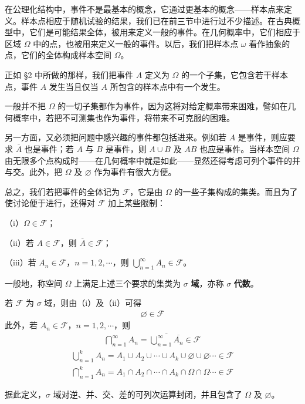 \documentclass[../../main.tex]{subfiles}
\begin{document}
在公理化结构中，事件不是最基本的概念，它通过更基本的概念——样本点来定义。样本点相应于随机试验的结果，我们已在前三节中进行过不少描述。在古典概型中，它们是可能结果全体，被用来定义一般的事件。在几何概率中，它们相应于区域 $\Omega$ 中的点，也被用来定义一般的事件。以后，我们把样本点 $\omega$ 看作抽象的点，它们的全体构成样本空间 $\Omega$。

正如 \S 2 中所做的那样，我们把事件 $A$ 定义为 $\Omega$ 的一个子集，它包含若干样本点，事件 $A$ 发生当且仅当 $A$ 所包含的样本点中有一个发生。

一般并不把 $\Omega$ 的一切子集都作为事件，因为这将对给定概率带来困难，譬如在几何概率中，若把不可测集也作为事件，将带来不可克服的困难。

另一方面，又必须把问题中感兴趣的事件都包括进来。例如若 $A$ 是事件，则应要求 $\overline{A}$ 也是事件；若 $A$ 与 $B$ 是事件，则 $A\cup B$ 及 $AB$ 也应是事件。当样本空间 $\Omega$ 由无限多个点构成时——在几何概率中就是如此——显然还得考虑可列个事件的并与交。此外，把 $\Omega$ 及 $\varnothing$ 作为事件有很大方便。

总之，我们若把事件的全体记为 $\mathscr{F}$，它是由 $\Omega$ 的一些子集构成的集类。而且为了使讨论便于进行，还得对 $\mathscr{F}$ 加上某些限制：

（i）$\Omega\in\mathscr{F}$；

（ii）若 $A\in\mathscr{F}$，则 $\overline{A}\in\mathscr{F}$；

（iii）若 $A_n\in\mathscr{F}$，$n=1,2,\cdots$，则 $\bigcup_{n=1}^{\infty}A_n\in\mathscr{F}$。

一般地，称空间 $\Omega$ 上满足上述三个要求的集类为 $\sigma$ \textbf{域}，亦称 $\sigma$ \textbf{代数}。

若 $\mathscr{F}$ 为 $\sigma$ 域，则由（i）及（ii）可得
\begin{align*}
\varnothing\in\mathscr{F}
\end{align*}
此外，若 $A_n\in\mathscr{F}$，$n=1,2,\cdots$，则
\begin{align*}
\bigcap_{n=1}^{\infty}A_n=\overline{\bigcup_{n=1}^{\infty}\overline{A_n}}\in\mathscr{F}
\end{align*}
\begin{align*}
\bigcup_{n=1}^{k}A_n=A_1\cup A_2\cup\cdots\cup A_k\cup\varnothing\cup\varnothing\cdots\in\mathscr{F}
\end{align*}
\begin{align*}
\bigcap_{n=1}^{k}A_n=A_1\cap A_2\cap\cdots\cap A_k\cap\Omega\cap\Omega\cdots\in\mathscr{F}
\end{align*}

据此定义，$\sigma$ 域对逆、并、交、差的可列次运算封闭，并且包含了 $\Omega$ 及 $\varnothing$。
\end{document}
